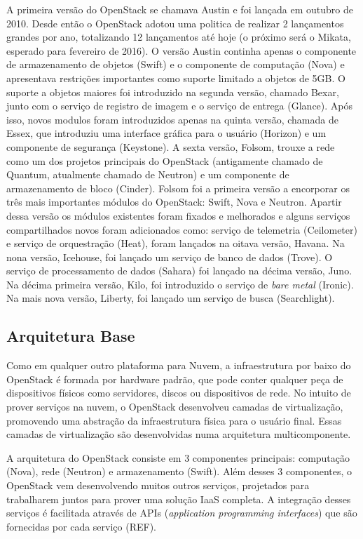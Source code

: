 A primeira versão do OpenStack se chamava Austin e foi lançada em outubro de 2010. Desde então o OpenStack adotou uma politica de realizar 2 lançamentos grandes por ano, totalizando 12 lançamentos até hoje (o próximo será o Mikata, esperado para fevereiro de 2016). O versão Austin continha apenas o componente de armazenamento de objetos (Swift) e o componente de computação (Nova) e apresentava restrições importantes como suporte limitado a objetos de 5GB. O suporte a objetos maiores foi introduzido na segunda versão, chamado Bexar, junto com o serviço de registro de imagem e o serviço de entrega (Glance). Após isso, novos modulos foram introduzidos apenas na quinta versão, chamada de Essex, que introduziu uma interface gráfica para o usuário (Horizon) e um componente de segurança (Keystone). A sexta versão, Folsom, trouxe a rede como um dos projetos principais do OpenStack (antigamente chamado de Quantum, atualmente chamado de Neutron) e um componente de armazenamento de bloco (Cinder). Folsom foi a primeira versão a encorporar os três mais importantes módulos do OpenStack: Swift, Nova e Neutron. Apartir dessa versão os módulos existentes foram fixados e melhorados e alguns serviços compartilhados novos foram adicionados como: serviço de telemetria (Ceilometer) e serviço de orquestração (Heat), foram lançados na oitava versão, Havana. Na nona versão, Icehouse, foi lançado um serviço de banco de dados (Trove). O serviço de processamento de dados (Sahara) foi lançado na décima versão, Juno. Na décima primeira versão, Kilo, foi introduzido o serviço de \textit{bare metal} (Ironic). Na mais nova versão, Liberty, foi lançado um serviço de busca (Searchlight).

\subsection{Arquitetura Base}

Como em qualquer outro plataforma para Nuvem, a infraestrutura por baixo do OpenStack é formada por hardware padrão, que pode conter qualquer peça de dispositivos físicos como servidores, discos ou dispositivos de rede. No intuito de prover serviços na nuvem, o OpenStack desenvolveu camadas de virtualização, promovendo uma abstração da infraestrutura física para o usuário final. Essas camadas de virtualização são desenvolvidas numa arquitetura multicomponente.

A arquitetura do OpenStack consiste em 3 componentes principais: computação (Nova), rede (Neutron) e armazenamento (Swift). Além desses 3 componentes, o OpenStack vem desenvolvendo muitos outros serviços, projetados para trabalharem juntos para prover uma solução IaaS completa. A integração desses serviços é facilitada através de APIs (\textit{application programming interfaces}) que são fornecidas por cada serviço (REF).

